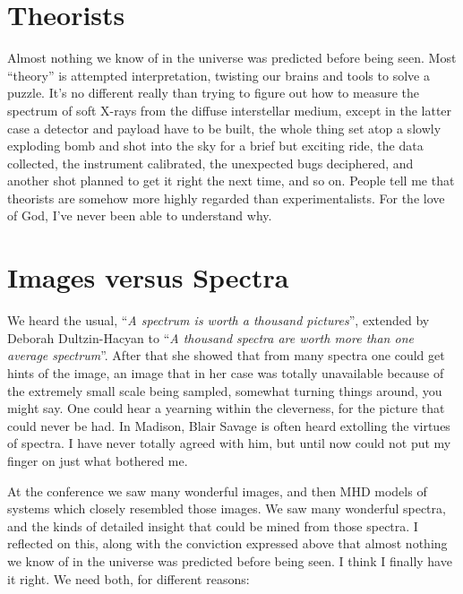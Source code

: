 \documentclass[proceedings]{rmaa}
\begin{document}
\section{Theorists}
\vspace*{-0.5ex}
\enlargethispage{2ex}
Almost nothing we know of in the universe was predicted before being 
seen.  Most ``theory'' is attempted interpretation, twisting our brains and 
tools to solve a puzzle.  It's no different really than trying to figure  
out how to measure the spectrum of soft X-rays from the diffuse 
interstellar medium, except in the latter case a detector and payload 
have to be built, the whole thing set atop a slowly exploding bomb and 
shot into the sky for a brief but exciting ride, the data collected, the  
instrument calibrated, the unexpected bugs deciphered, and another shot 
planned to get it right the next time, and so on.  People tell me that 
theorists are somehow more highly regarded than experimentalists.  For 
the love of God, I've never been able to understand why. 
\vspace*{-0.75ex}

\section{Images versus Spectra}
\vspace*{-0.75ex}

We heard the usual, ``{\it A spectrum is worth a thousand pictures}'', extended 
by Deborah Dultzin-Hacyan to ``{\it A thousand spectra are worth more than one  
average spectrum}''.  After that she showed that from many spectra one 
could get hints of the image, an image that in her case was totally 
unavailable because of the extremely small scale being sampled, somewhat  
turning things around, you might say.  One could hear a yearning within 
the cleverness, for the picture that could never be had.  In Madison, 
Blair Savage is often heard extolling the virtues of spectra.  I have 
never totally agreed with him, but until now could not put my finger on 
just what bothered me.
  
        At the conference we saw many wonderful images, and then MHD 
models of systems which closely resembled those images.  We saw many 
wonderful spectra, and the kinds of detailed insight that could be mined  
from those spectra.  I reflected on this, along with the conviction 
expressed above that almost nothing we know of in the universe was 
predicted before being seen.  I think I finally have it right.  We need 
both, for different reasons:\vspace*{1ex}
\end{document}
